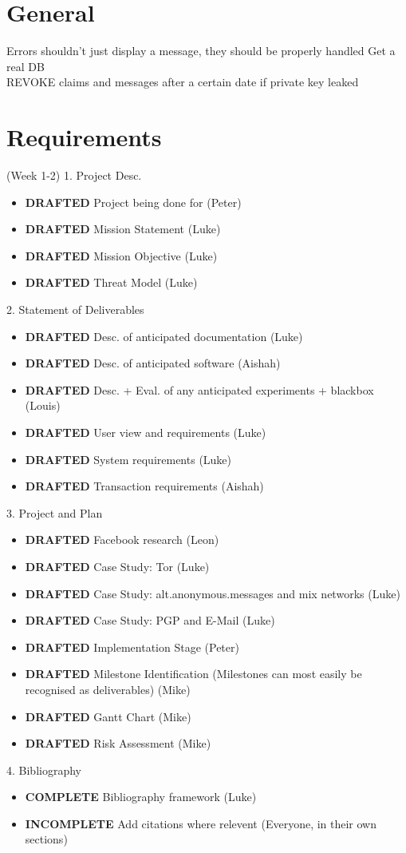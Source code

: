 \section{General}
Errors shouldn't just display a message, they should be properly handled
Get a real DB\\
REVOKE claims and messages after a certain date if private key leaked\\

\section{Requirements} (Week 1-2)
1. Project Desc.
\begin{itemize}
\item \textbf{DRAFTED} Project being done for (Peter)
\item \textbf{DRAFTED} Mission Statement (Luke)
\item \textbf{DRAFTED} Mission Objective (Luke)
\item \textbf{DRAFTED} Threat Model (Luke)
\end{itemize}

2. Statement of Deliverables
\begin{itemize}
\item \textbf{DRAFTED}    Desc. of anticipated documentation (Luke)
\item \textbf{DRAFTED}    Desc. of anticipated software (Aishah)
\item \textbf{DRAFTED}    Desc. + Eval. of any anticipated experiments + blackbox (Louis)
\item \textbf{DRAFTED}    User view and requirements (Luke)
\item \textbf{DRAFTED}    System requirements (Luke)
\item \textbf{DRAFTED}    Transaction requirements (Aishah)
\end{itemize}

3. Project and Plan
\begin{itemize}
\item \textbf{DRAFTED}     Facebook research (Leon)
\item \textbf{DRAFTED}     Case Study: Tor (Luke)
\item \textbf{DRAFTED}     Case Study: alt.anonymous.messages and mix networks (Luke)
\item \textbf{DRAFTED}     Case Study: PGP and E-Mail (Luke)
\item \textbf{DRAFTED}     Implementation Stage (Peter)
\item \textbf{DRAFTED}     Milestone Identification (Milestones can most easily be recognised as deliverables) (Mike)
\item \textbf{DRAFTED}     Gantt Chart (Mike)
\item \textbf{DRAFTED}     Risk Assessment (Mike)
\end{itemize}

4. Bibliography
\begin{itemize}
\item \textbf{COMPLETE}   Bibliography framework (Luke)
\item \textbf{INCOMPLETE} Add citations where relevent (Everyone, in their own sections)
\end{itemize}
